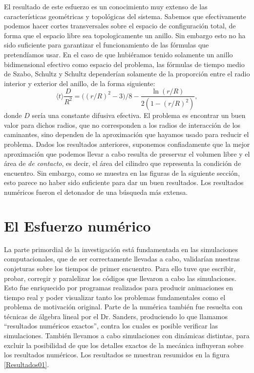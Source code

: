 \documentclass[letterpaperr,12pt]{article}
\begin{document}
El resultado de este esfuerzo es un conocimiento muy extenso
de las características geométricas y topológicas del sistema. Sabemos
que efectivamente podemos hacer cortes transversales sobre el espacio
de configuración total, de forma que el espacio libre sea topologicamente un
anillo. Sin embargo esto no ha sido suficiente para garantizar
el funcionamiento de las fórmulas que pretendíamos usar.
En el caso de que hubiéramos tenido solamente un anillo bidimensional
efectivo como espacio del problema, las fórmulas de tiempo medio
de Szabo, Schultz y Schultz dependerían solamente de la proporción
entre el radio interior y exterior del anillo, de la forma siguiente:
\begin{equation}\label{Szabo01}
\langle t \rangle \frac{D}{R^2}=
\bigl((r/R)^2-3\bigr)/8 -\frac{\ln (r/R)}{2(1-(r/R)^2)},
\end{equation}
donde $D$ sería una constante difusiva efectiva.
El problema es encontrar un buen valor para dichos radios, que no corresponden
a los radios de interacción de los caminantes, sino dependen de la aproximación
que hayamos usado para reducir el problema. Dados los resultados anteriores,
suponemos confiadamente que la mejor aproximación que podemos llevar a cabo
resulta de preservar el volumen libre y el área de \emph{de contacto},
es decir, el área del cilindro que representa la condición de encuentro.
Sin embargo, como se muestra en las figuras de la siguiente
sección, esto parece no haber sido suficiente para dar un buen resultados. 
Los resultados numéricos fueron el detonador de una búsqueda más extensa.


\section{El Esfuerzo numérico}

La parte primordial de la investigación está fundamentada en las 
simulaciones computacionales, que de ser correctamente llevadas a cabo,
validarían nuestras conjeturas sobre los tiempos de primer encuentro.
Para ello tuve que escribir, probar, corregir y paralelizar
los códigos que llevaron a cabo las simulaciones. Esto fue enriquecido
por programas realizados para producir animaciones en tiempo real
y poder visualizar tanto los problemas fundamentales como el problema
de motivación original. Parte de la numérica también fue resuelta
con técnicas de álgebra lineal por el Dr. Sanders, produciendo
lo que llamamos ``resultados numéricos exactos'', contra los
cuales es posible verificar las simulaciones. También llevamos a cabo
simulaciones con dinámicas distintas, para excluir la posibilidad de
que los detalles exactos de la mecánica influyeran sobre los resultados numéricos.
Los resultados se muestran resumidos en la figura \ref{Resultados01}.
\end{document}
